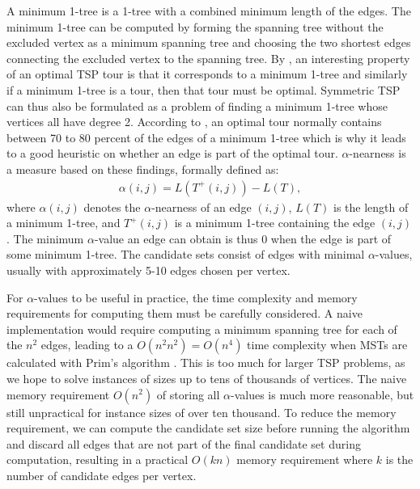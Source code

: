 \documentclass[english, 12pt, a4paper, sci, utf8, a-1b, online]{aaltothesis}
\begin{document}
A minimum 1-tree is a 1-tree with a combined minimum length of the edges. The minimum 1-tree can be computed by forming the spanning tree without the excluded vertex as a minimum spanning tree and choosing the two shortest edges connecting the excluded vertex to the spanning tree. By \cite{BF01584070}, an interesting property of an optimal TSP tour is that it corresponds to a minimum 1-tree and similarly if a minimum 1-tree is a tour, then that tour must be optimal. Symmetric TSP can thus also be formulated as a problem of finding a minimum 1-tree whose vertices all have degree 2. According to \cite{HELSGAUN2000106}, an optimal tour normally contains between 70 to 80 percent of the edges of a minimum 1-tree which is why it leads to a good heuristic on whether an edge is part of the optimal tour. $\alpha$-nearness is a measure based on these findings, formally defined as:
\begin{align*}
    \alpha (i, j) = L (T^+(i, j)) - L(T),
\end{align*}
where $\alpha(i, j)$ denotes the $\alpha$-nearness of an edge $(i, j)$, $L(T)$ is the length of a minimum 1-tree, and $T^+(i,j)$ is a minimum 1-tree containing the edge $(i, j)$. The minimum $\alpha$-value an edge can obtain is thus 0 when the edge is part of some minimum 1-tree. The candidate sets consist of edges with minimal $\alpha$-values, usually with approximately 5-10 edges chosen per vertex.

For $\alpha$-values to be useful in practice, the time complexity and memory requirements for computing them must be carefully considered. A naive implementation would require computing a minimum spanning tree for each of the $n^2$ edges, leading to a $O(n^2 n^2) = O(n^4)$ time complexity when MSTs are calculated with Prim's algorithm \citep{jarnik}. This is too much for larger TSP problems, as we hope to solve instances of sizes up to tens of thousands of vertices. The naive memory requirement $O(n^2)$ of storing all $\alpha$-values is much more reasonable, but still unpractical for instance sizes of over ten thousand. To reduce the memory requirement, we can compute the candidate set size before running the algorithm and discard all edges that are not part of the final candidate set during computation, resulting in a practical $O(kn)$ memory requirement where $k$ is the number of candidate edges per vertex.
\end{document}
